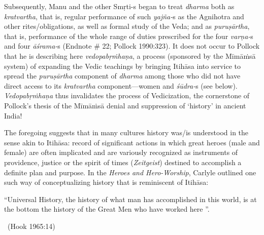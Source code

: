 Subsequently, Manu and the other Smṛti-s began to treat \textit{dharma} both as \textit{kratvartha}, that is, regular performance of such \textit{yajña-}s as the Agnihotra and other rites/obligations, as well as formal study of the Veda; and as \textit{puruṣārtha}, that is, performance of the whole range of duties prescribed for the four \textit{varṇa-}s and four \textit{āśrama-}s (Endnote \# 22; Pollock 1990:323). It does not occur to Pollock that he is describing here \textit{vedopabṛṁhaṇa}, a process (sponsored by the Mīmāṁsā system) of expanding the Vedic teachings by bringing Itihāsa into service to spread the \textit{puruṣārtha} component of \textit{dharma} among those who did not have direct access to its \textit{kratvartha} component—women and \textit{śūdra-}s (see below). \textit{Vedopabṛṁhaṇa} thus invalidates the process of Vedicization, the cornerstone of Pollock’s thesis of the Mīmāṁsā denial and suppression of ‘history’ in ancient India! 

The foregoing suggests that in many cultures history was/is understood in the sense akin to Itihāsa: record of significant actions in which great heroes (male and female) are often implicated and are variously recognized as instruments of providence, justice or the spirit of times (\textit{Zeitgeist}) destined to accomplish a definite plan and purpose. In the \textit{Heroes and Hero-Worship}, Carlyle outlined one such way of conceptualizing history that is reminiscent of Itihāsa:

\begin{myquote}
“Universal History, the history of what man has accomplished in this world, is at the bottom the history of the Great Men who have worked here ”.

~\hfill (Hook 1965:14)
\end{myquote}

